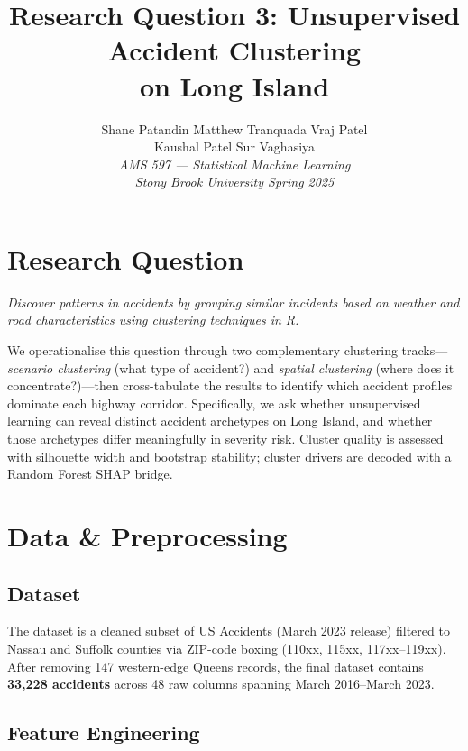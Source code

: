 \documentclass[11pt,letterpaper]{article}
\title{\textbf{Research Question 3: Unsupervised Accident Clustering\\on Long Island}}
\author{
Shane Patandin \quad Matthew Tranquada \quad Vraj Patel\\
Kaushal Patel \quad Sur Vaghasiya\\[4pt]
\textit{AMS 597 --- Statistical Machine Learning}\\
\textit{Stony Brook University \textperiodcentered{} Spring 2025}
}
\date{}
\begin{document}
\maketitle
\thispagestyle{empty}

\section{Research Question}

\emph{Discover patterns in accidents by grouping similar incidents based on weather and road characteristics using clustering techniques in R.}

We operationalise this question through two complementary clustering tracks---\emph{scenario clustering} (what type of accident?) and \emph{spatial clustering} (where does it concentrate?)---then cross-tabulate the results to identify which accident profiles dominate each highway corridor. Specifically, we ask whether unsupervised learning can reveal distinct accident archetypes on Long Island, and whether those archetypes differ meaningfully in severity risk.
Cluster quality is assessed with silhouette width and bootstrap stability; cluster drivers are decoded with a Random Forest SHAP bridge.

\section{Data \& Preprocessing}

\subsection{Dataset}

The dataset is a cleaned subset of US Accidents (March 2023 release) filtered to Nassau and Suffolk counties via ZIP-code boxing (110xx, 115xx, 117xx--119xx). After removing 147 western-edge Queens records, the final dataset contains \textbf{33,228 accidents} across 48 raw columns spanning March 2016--March 2023.

\subsection{Feature Engineering}
\end{document}

